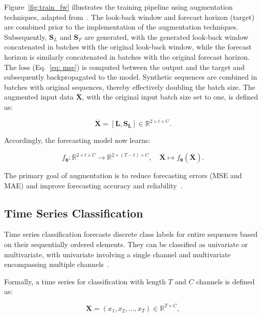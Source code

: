Figure~\ref{fig:train_fw} illustrates the training pipeline using augmentation techniques, adapted from~\cite{chen2023fraugfrequencydomainaugmentation}. The look-back window and forecast horizon (target) are combined prior to the implementation of the augmentation techniques. Subsequently, $\mathbf{S}_L$ and $\mathbf{S}_F$ are generated, with the generated look-back window concatenated in batches with the original look-back window, while the forecast horizon is similarly concatenated in batches with the original forecast horizon. The loss (Eq.~\ref{eq: mse}) is computed between the output and the target and subsequently backpropagated to the model. Synthetic sequences are combined in batches with original sequences, thereby effectively doubling the batch size. The augmented input data $\mathbf{\overline{X}}$, with the original input batch size set to one, is defined as:


\begin{equation}
\mathbf{\overline{X}} = [ \mathbf{L}, \mathbf{S_L}] \in \mathbb{R}^{2 \times t \times C}.
\end{equation}

Accordingly, the forecasting model now learns:

\begin{equation}
f_{\boldsymbol{\theta}}: \mathbb{R}^{2 \times t \times C} \rightarrow \mathbb{R}^{2 \times (T - t) \times C}, \quad \mathbf{\overline{X}} \mapsto f_{\boldsymbol{\theta}}(\mathbf{\overline{X}}).
\end{equation}

The primary goal of augmentation is to reduce forecasting errors (MSE and MAE) and improve forecasting accuracy and reliability~\cite{Wen_2021}.

\subsection*{Time Series Classification}

Time series classification forecasts discrete class labels for entire sequences based on their sequentially ordered elements. They can be classified as univariate or multivariate, with univariate involving a single channel and multivariate encompassing multiple channels~\cite{Ismail_Fawaz_2020, gao2024dataaugmentationtimeseriesclassification}.


Formally, a time series for classification with length $T$ and $C$ channels is defined as:

\begin{equation}
\mathbf{X} = (x_1, x_2, \dots, x_T) \in \mathbb{R}^{T \times C},
\end{equation}

